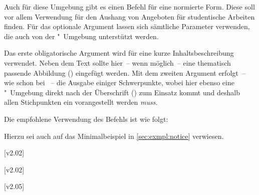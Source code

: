 \begin{DeclareEntity}{}
\begin{Declaration}
  {}
\printdeclarationlist

Auch für diese Umgebung gibt es einen Befehl für eine normierte Form. Diese 
soll vor allem Verwendung für den Aushang von Angeboten für studentische 
Arbeiten finden. Für das optionale Argument lassen sich sämtliche Parameter 
verwenden, die auch von der "~Umgebung unterstützt werden.

Das erste obligatorische Argument wird für eine kurze Inhaltsbeschreibung 
verwendet. Neben dem Text sollte hier~-- wenn möglich~-- eine thematisch 
passende Abbildung () eingefügt werden. Mit dem zweiten 
Argument erfolgt~-- wie schon bei ~-- die Ausgabe einiger 
Schwerpunkte, wobei hier ebenso eine "~Umgebung direkt 
nach der Überschrift () zum Einsatz kommt und deshalb allen 
Stichpunkten ein  vorangestellt werden \emph{muss}.
\end{Declaration}
%
\begin{Example}
Die empfohlene Verwendung des Befehls  ist wie folgt:
\begin{Code}[escapechar=§]
}{%
  \item Schwerpunkt 1
  \item Schwerpunkt 2
  \item Schwerpunkt 3
}
\end{Code}
Hierzu sei auch auf das Minimalbeispiel in \autoref{sec:exmpl:notice} verwiesen.
\end{Example}

\begin{Declaration}
  {}
  [v2.02]
\begin{Declaration*}
  {}
\begin{Declaration*}
  {}
\begin{Declaration}
  {}
  [v2.02]
\begin{Declaration}
  {}
  [v2.05]
\begin{Declaration}
  {}
\printdeclarationlist


\end{Declaration}
\end{Declaration}
\end{Declaration}
\end{Declaration*}
\end{Declaration*}
\end{Declaration}
\end{DeclareEntity}
